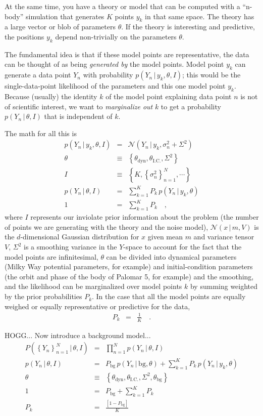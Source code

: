 \documentclass[12pt,pdftex,preprint]{aastex}
\newcommand{\setof}[1]{\left\{{#1}\right\}}
\newcommand{\given}{\,|\,}
\newcommand{\bg}{\mathrm{bg}}
\newcommand{\dyn}{\mathrm{dyn}}
\newcommand{\ic}{\mathrm{I.C.}}
\newcommand{\normal}{\mathscr{N}}
\begin{document}
At the same time, you have a theory or model that can be computed with
a ``n-body'' simulation that generates $K$ points $y_k$ in that same
space.  The theory has a large vector or blob of parameters $\theta$.
If the theory is interesting and predictive, the positions $y_k$
depend non-trivially on the parameters $\theta$.

The fundamental idea is that if these model points are representative,
the data can be thought of as being \emph{generated by} the model
points.  Model point $y_k$ can generate a data point $Y_n$ with
probability $p(Y_n\given y_k,\theta,I)$; this would be the
single-data-point likelihood of the parameters and this one model
point $y_k$.  Because (usually) the identity $k$ of the model point
explaining data point $n$ is not of scientific interest, we want to
\emph{marginalize out} $k$ to get a probability $p(Y_n\given\theta,I)$
that is independent of $k$.

The math for all this is
\begin{eqnarray}
p(Y_n\given y_k,\theta,I) &=& \normal(Y_n\given y_k,\sigma^2_n+\Sigma^2)
\\
\theta &\equiv& \setof{\theta_\dyn, \theta_\ic, \Sigma^2}
\\
I &\equiv& \setof{K, \setof{\sigma^2_n}_{n=1}^N, \cdots}
\\
p(Y_n\given\theta,I) &=& \sum_{k=1}^K P_k\,p(Y_n\given y_k,\theta)
\\
1 &=& \sum_{k=1}^K P_k
\quad ,
\end{eqnarray}
where $I$ represents our inviolate prior information about the problem
(the number of points we are generating with the theory and the noise
model), $\normal(x\given m, V)$ is the $d$-dimensional Gaussian
distribution for $x$ given mean $m$ and variance tensor $V$,
$\Sigma^2$ is a smoothing variance in the $Y$-space to account for the
fact that the model points are infinitesimal, $\theta$ can be divided
into dynamical parameters (Milky Way potential parameters, for
example) and initial-condition parameters (the orbit and phase of the
body of Palomar 5, for example) and the smoothing, and the likelihood
can be marginalized over model points $k$ by summing weighted by the
prior probabilities $P_k$.  In the case that all the model points are
equally weighed or equally representative or predictive for the data,
\begin{eqnarray}
P_k &=& \frac{1}{K}
\quad .
\end{eqnarray}

HOGG... Now introduce a background model...
\begin{eqnarray}
P(\setof{Y_n}_{n=1}^N\given\theta,I) &=& \prod_{n=1}^N p(Y_n\given\theta,I)
\\
p(Y_n\given\theta,I) &=& P_\bg\,p(Y_n\given \bg,\theta) + \sum_{k=1}^K P_k\,p(Y_n\given y_k,\theta)
\\
\theta &\equiv& \setof{\theta_\dyn, \theta_\ic, \Sigma^2, \theta_\bg}
\\
1 &=& P_\bg + \sum_{k=1}^K P_k
\\
P_k &=& \frac{[1 - P_\bg]}{K}
\end{eqnarray}
\end{document}

